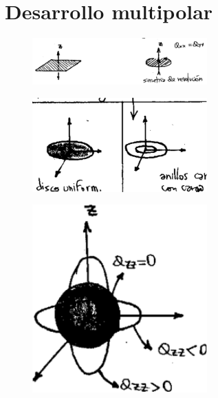 \documentclass[10pt,oneside]{CBFT_book}
\begin{document}
\section{Desarrollo multipolar}



\begin{figure}[htb]
	\begin{center}
	\includegraphics[width=0.6\textwidth]{images/fig_ft1_multipolo2.pdf}	 
	\end{center}
	\caption{}
\end{figure}

\begin{figure}[htb]
	\begin{center}
	\includegraphics[width=0.6\textwidth]{images/fig_ft1_multipolo3.pdf}	 
	\end{center}
	\caption{}
\end{figure}

\begin{figure}[htb]
	\begin{center}
	\includegraphics[width=0.6\textwidth]{images/fig_ft1_multipolo4.pdf}	 
	\end{center}
	\caption{}
\end{figure}
\end{document}
